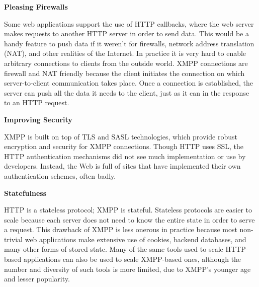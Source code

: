       \textbf{Pleasing Firewalls}

      Some web applications support the use of HTTP callbacks, where the web server makes requests to
      another HTTP server in order to send data. This would be a handy feature to push data if it weren’t
      for firewalls, network address translation (NAT), and other realities of the Internet. In practice it is
      very hard to enable arbitrary connections to clients from the outside world.
      XMPP connections are firewall and NAT friendly because the client initiates the connection on
      which server-to-client communication takes place. Once a connection is established, the server can
      push all the data it needs to the client, just as it can in the response to an HTTP request.

      \textbf{Improving Security}

      XMPP is built on top of TLS and SASL technologies, which provide robust encryption and security
      for XMPP connections. Though HTTP uses SSL, the HTTP authentication mechanisms did not see
      much implementation or use by developers. Instead, the Web is full of sites that have implemented
      their own authentication schemes, often badly.

      \textbf{Statefulness}

      HTTP is a stateless protocol; XMPP is stateful. Stateless protocols are easier to scale because each
      server does not need to know the entire state in order to serve a request. This drawback of XMPP
      is less onerous in practice because most non-trivial web applications make extensive use of cookies,
      backend databases, and many other forms of stored state.
      Many of the same tools used to scale HTTP-based applications can also be used to scale XMPP-based
      ones, although the number and diversity of such tools is more limited, due to XMPP’s younger age and
      lesser popularity.

